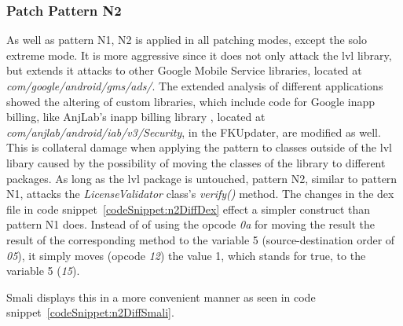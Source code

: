 \subsubsection{Patch Pattern N2}
As well as pattern N1, N2 is applied in all patching modes, except the solo extreme mode.
It is more aggressive since it does not only attack the \gls{lvl} library, but extends it attacks to other Google Mobile Service libraries, located at \textit{com/google/android/gms/ads/}.
The extended analysis of different applications showed the altering of custom libraries, which include code for Google inapp billing, like AnjLab's inapp billing library \cite{inappBilling}, located at \textit{com/anjlab/android/iab/v3/Security}, in the FKUpdater, are modified as well.
This is collateral damage when applying the pattern to classes outside of the \gls{lvl} libary caused by the possibility of moving the classes of the library to different packages.
As long as the \gls{lvl} package is untouched, pattern N2, similar to pattern N1, attacks the \textit{LicenseValidator} class's \textit{verify()} method.
\newline
The changes in the \gls{dex} file in code snippet~\ref{codeSnippet:n2DiffDex} effect a simpler construct than pattern N1 does.
Instead of of using the opcode \textit{0a} for moving the result the result of the corresponding method to the variable 5 (source-destination order of \textit{05}), it simply moves (opcode \textit{12}) the value 1, which stands for true, to the variable 5 (\textit{15}).
\newline


Smali displays this in a more convenient manner as seen in code snippet~\ref{codeSnippet:n2DiffSmali}.
\newline


